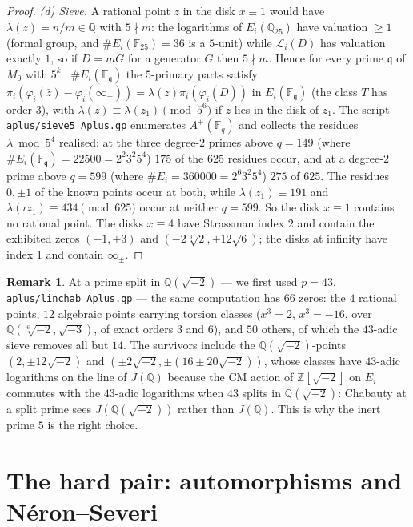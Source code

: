\documentclass[11pt,reqno]{amsart}
\theoremstyle{plain}
\theoremstyle{definition}
\newtheorem{remark}[theorem]{Remark}
\newcommand{\Q}{\mathbb{Q}}
\newcommand{\Z}{\mathbb{Z}}
\newcommand{\FF}{\mathbb{F}}
\newcommand{\qq}{\mathfrak{q}}
\numberwithin{equation}{section}
\begin{document}
\begin{proof}
\emph{(d) Sieve.} A rational point $z$ in the disk $x\equiv1$ would have
$\lambda(z)=n/m\in\Q$ with $5\nmid m$: the logarithms of $E_{i}(\Q_{25})$ have
valuation $\ge1$ (formal group, and $\#E_{i}(\FF_{25})=36$ is a $5$-unit) while
$\mathcal{L}_{i}(D)$ has valuation exactly $1$, so if $D=mG$ for a generator $G$
then $5\nmid m$. Hence for every prime $\qq$ of $M_{0}$ with
$5^{k}\mid \#E_{i}(\FF_{\qq})$ the $5$-primary parts satisfy
$\pi_{i}(\varphi_{i}(\bar z)-\varphi_{i}(\infty_{+}))=\lambda(z)\pi_{i}(\varphi_{i}(\bar D))$
in $E_{i}(\FF_{\qq})$ (the class $T$ has order $3$), with
$\lambda(z)\equiv\lambda(z_{1})\pmod{5^{6}}$ if $z$ lies in the disk of $z_{1}$.
The script \texttt{aplus/sieve5\_Aplus.gp} enumerates $A^{+}(\FF_{q})$ and
collects the residues $\lambda \bmod 5^{4}$ realised: at the three degree-$2$
primes above $q=149$ (where $\#E_{i}(\FF_{\qq})=22500=2^{2}3^{2}5^{4}$) $175$ of
the $625$ residues occur, and at a degree-$2$ prime above $q=599$ (where
$\#E_{i}=360000=2^{6}3^{2}5^{4}$) $275$ of $625$. The residues $0,\pm1$ of the
known points occur at both, while $\lambda(z_{1})\equiv191$ and
$\lambda(\iota z_{1})\equiv434 \pmod{625}$ occur at neither $q=599$. So the disk
$x\equiv1$ contains no rational point. The disks $x\equiv4$ have Strassman index
$2$ and contain the exhibited zeros $(-1,\pm3)$ and
$(-2\sqrt[3]{2},\pm12\sqrt6)$; the disks at infinity have index $1$ and contain
$\infty_{\pm}$.
\end{proof}

\begin{remark}
At a prime split in $\Q(\sqrt{-2})$ --- we first used $p=43$,
\texttt{aplus/linchab\_Aplus.gp} --- the same computation has $66$ zeros: the $4$
rational points, $12$ algebraic points carrying torsion classes ($x^{3}=2$,
$x^{3}=-16$, over $\Q(\sqrt[6]{-2},\sqrt{-3})$, of exact orders $3$ and $6$),
and $50$ others, of which the $43$-adic sieve removes all but $14$. The
survivors include the $\Q(\sqrt{-2})$-points $(2,\pm12\sqrt{-2})$ and
$(\pm2\sqrt{-2},\pm(16\pm20\sqrt{-2}))$, whose classes have $43$-adic logarithms
on the line of $J(\Q)$ because the CM action of $\Z[\sqrt{-2}]$ on $E_{i}$
commutes with the $43$-adic logarithms when $43$ splits in $\Q(\sqrt{-2})$:
Chabauty at a split prime sees $J(\Q(\sqrt{-2}))$ rather than $J(\Q)$. This is
why the inert prime $5$ is the right choice.
\end{remark}

\section{The hard pair: automorphisms and N\'eron--Severi}\label{sec:structure}
\end{document}
